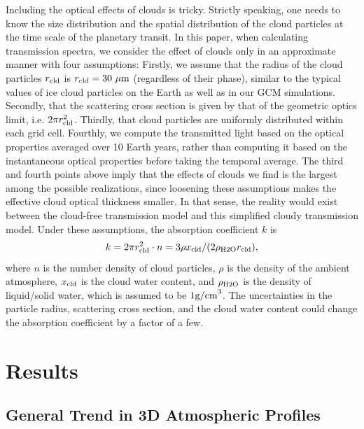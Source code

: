 \documentclass[11pt,numberedappendix,twocolappendix,]{emulateapj}
\begin{document}
Including the optical effects of clouds is tricky. 
Strictly speaking, one needs to know the size distribution and the spatial distribution of the cloud particles at the time scale of the planetary transit. 
In this paper, when calculating transmission spectra, we consider the effect of clouds only in an approximate manner with four assumptions:
%
Firstly, we assume that the radius of the cloud particles $r_{\rm cld}$ is $r_{\rm cld}=30~\mu {\rm m}$ (regardless of their phase), similar to the typical values of ice cloud particles on the Earth as well as in our GCM simulations.  
%
Secondly, that the scattering cross section is given by that of the geometric optics limit, i.e. $2 \pi r_{\rm cld}^2$. 
%
Thirdly, that cloud particles are uniformly distributed within each grid cell. 
%
Fourthly, we compute the transmitted light based on the optical properties averaged over 10 Earth years, rather than computing it based on the instantaneous optical properties before taking the temporal average. 
%
The third and fourth points above imply that the effects of clouds we find is the largest among the possible realizations, since loosening these assumptions makes the effective cloud optical thickness smaller. 
In that sense, the reality would exist between the cloud-free transmission model and this simplified cloudy transmission model. 
Under these assumptions, the absorption coefficient $k$ is %
\begin{equation}
k = 2 \pi r_{\rm cld}^2 \cdot n = 3 \rho x_{\rm cld} / ( 2 \rho_{\rm H2O} r_{\rm cld} ),
\end{equation}
where $n$ is the number density of cloud particles, $\rho $ is the density of the ambient atmosphere, $x_{\rm cld}$ is the cloud water content, and $\rho_{\rm H2O}$ is the density of liquid/solid water, which is assumed to be $1 {\rm g/cm}^3$. 
The uncertainties in the particle radius, scattering cross section, and the cloud water content could change the absorption coefficient by a factor of a few. 


\section{Results}
\label{s:results}


\subsection{General Trend in 3D Atmospheric Profiles}
\label{ss:result_H2Omixingratio}
\end{document}
